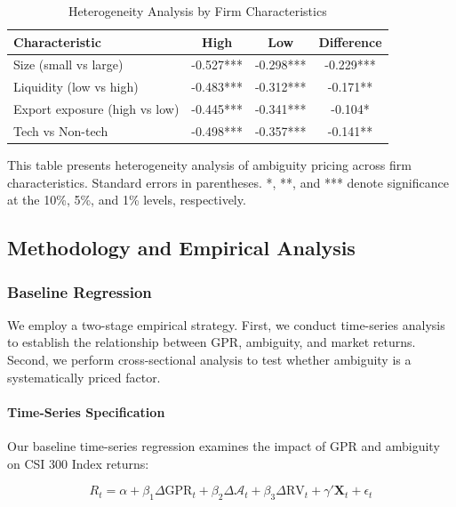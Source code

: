 \documentclass[preprint,12pt,authoryear]{elsarticle}
\begin{document}
\begin{table}[htbp]
\centering
\caption{Heterogeneity Analysis by Firm Characteristics}
\label{tab:heterogeneity}
\begin{threeparttable}
\begin{tabular*}{\textwidth}{@{\extracolsep{\fill}} lccc @{\extracolsep{\fill}}}
\toprule
Characteristic & High & Low & Difference \\
\midrule
Size (small vs large) & -0.527*** & -0.298*** & -0.229*** \\
Liquidity (low vs high) & -0.483*** & -0.312*** & -0.171** \\
Export exposure (high vs low) & -0.445*** & -0.341*** & -0.104* \\
Tech vs Non-tech & -0.498*** & -0.357*** & -0.141** \\
\bottomrule
\end{tabular*}
\begin{tablenotes}[flushleft]
\small
\item[] This table presents heterogeneity analysis of ambiguity pricing across firm characteristics. Standard errors in parentheses. *, **, and *** denote significance at the 10\%, 5\%, and 1\% levels, respectively.
\end{tablenotes}
\end{threeparttable}
\end{table}

\subsection{Methodology and Empirical Analysis}

\subsubsection{Baseline Regression}

We employ a two-stage empirical strategy. First, we conduct time-series analysis to establish the relationship between GPR, ambiguity, and market returns. Second, we perform cross-sectional analysis to test whether ambiguity is a systematically priced factor.

\paragraph{Time-Series Specification}
Our baseline time-series regression examines the impact of GPR and ambiguity on CSI 300 Index returns:

\begin{equation}
R_{t} = \alpha + \beta_1 \Delta \text{GPR}_{t} + \beta_2 \Delta \mathcal{A}_{t} + \beta_3 \Delta \text{RV}_{t} + \gamma' \mathbf{X}_{t} + \epsilon_{t}
\end{equation}
\end{document}
